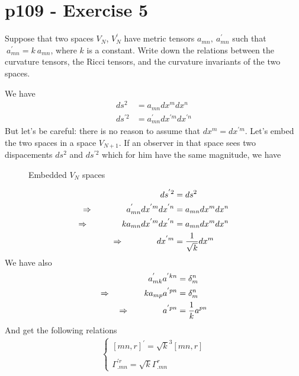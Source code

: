 \section{p109 - Exercise 5}
\begin{tcolorbox}
Suppose that two spaces $V_N$, $V^{'}_N$ have metric tensors $a_{mn}, \ a^{'}_{mn}$ such that $\ a^{'}_{mn}=k\ a_{mn}  $, where $k$ is a constant. Write down the relations between the curvature tensors, the Ricci tensors, and the curvature invariants of the two spaces.
\end{tcolorbox}
We have 
\begin{align}
 ds^2 &= a_{mn}dx^{m} dx^{n}\\
 ds^{'2}&= a^{'}_{mn} dx^{'m}dx^{'n}
\end{align}
But let's be careful: there is no reason to assume that  $dx^m = dx^{'m}$. Let's embed the two spaces in a space $V_{N+1}$. If an observer in that space sees two dispacements  $ds^2$ and $ds^{'2}$ which for him have the same magnitude, we have
\begin{figure}[H]
\centering
\begin{minipage}[t]{.4\textwidth}
\vspace{0pt}

\end{minipage}\hfill
\caption{Embedded $V_N$ spaces}
\label{fig:p109_Ex5_a}
\end{figure}
\begin{align}
 ds^{'2} &= ds^2\\
 \Rightarrow \quad\quad\quad\quad a^{'}_{mn} dx^{'m}dx^{'n} &= a_{mn}dx^{m} dx^{n}\\
 \Rightarrow \quad\quad\quad\quad k a_{mn} dx^{'m}dx^{'n} &= a_{mn}dx^{m} dx^{n}\\
 \Rightarrow \quad\quad\quad\quad dx^{'m} &= \frac{1}{\sqrt{k}}dx^{m}
\end{align}
We have also
\begin{align}
 a^{'}_{mk}a^{'kn} &= \delta^n_m\\
 \Rightarrow \quad\quad\quad\quad ka_{mp}a^{'pn} &= \delta^n_m\\
 \Rightarrow \quad\quad\quad\quad a^{'pn} &= \frac{1}{k}a^{pn}
\end{align}
And get the following relations
\begin{align}
\left \{ \begin{array}{l}
 [mn,r]^{'} = \sqrt{k}^3[mn,r]\\\\
 \Gamma^{'r}_{.mn} =\sqrt{k}\Gamma^{r}_{.mn}
 \end {array}\right.
 \end{align}
